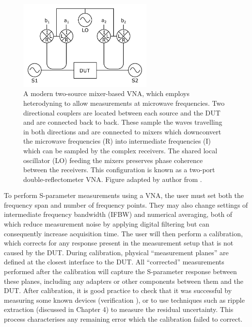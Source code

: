 \documentclass[../thesis/thesis.tex]{subfiles}
\begin{document}
\begin{figure}[t]
	\centering
	\includegraphics[width=0.6\textwidth]{ch2_vna}
	\caption[Structure of a two-source mixer-based VNA.]{A modern two-source mixer-based VNA, which employs heterodyning to allow measurements at microwave frequencies. Two directional couplers are located between each source and the DUT and are connected back to back. These sample the waves travelling in both directions and are connected to mixers which downconvert the microwave frequencies (R) into intermediate frequencies (I) which can be sampled by the complex receivers. The shared local oscillator (LO) feeding the mixers preserves phase coherence between the receivers. This configuration is known as a two-port double-reflectometer VNA. Figure adapted by author from \cite{Root_2013}.}
	\label{ch2_fig_vna}
\end{figure}

To perform S-parameter measurements using a VNA, the user must set both the frequency span and number of frequency points. They may also change settings of intermediate frequency bandwidth (IFBW) and numerical averaging, both of which reduce measurement noise by applying digital filtering but can consequently increase acquisition time. The user will then perform a calibration, which corrects for any response present in the measurement setup that is not caused by the DUT. During calibration, physical ``measurement planes'' are defined at the closest interface to the DUT. All ``corrected'' measurements performed after the calibration will capture the S-parameter response between these planes, including any adapters or other components between them and the DUT. After calibration, it is good practice to check that it was successful by measuring some known devices (verification \cite{Collier_2007}), or to use techniques such as ripple extraction (discussed in Chapter 4) to measure the residual uncertainty. This process characterises any remaining error which the calibration failed to correct.
\end{document}
